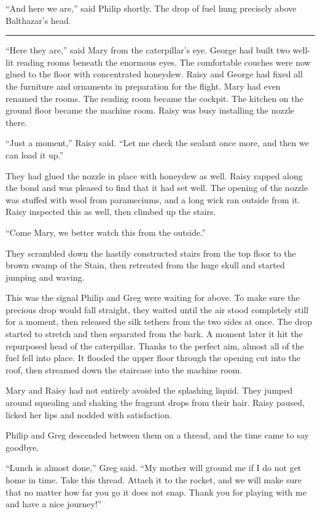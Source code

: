 \documentclass[10pt]{memoir}
\renewcommand{\pfbreakdisplay}{\bigskip \ding{166} \bigskip}
\newcommand{\secbreak}{\fancybreak{\pfbreakdisplay}}
\begin{document}
``And here we are,'' said Philip shortly. The drop of fuel hung precisely above
Balthazar's head.

\secbreak

``Here they are,'' said Mary from the caterpillar's eye. George had built two
well-lit reading rooms beneath the enormous eyes. The comfortable couches were
now glued to the floor with concentrated honeydew. Raisy and George had fixed
all the furniture and ornaments in preparation for the flight. Mary had even
renamed the rooms. The reading room became the cockpit. The kitchen on the
ground floor became the machine room. Raisy was busy installing the nozzle
there.

``Just a moment,'' Raisy said. ``Let me check the sealant once more, and then
we can load it up.''

They had glued the nozzle in place with honeydew as well. Raisy rapped along
the bond and was pleased to find that it had set well. The opening of the
nozzle was stuffed with wool from parameciums, and a long wick ran outside from
it. Raisy inspected this as well, then climbed up the stairs.

``Come Mary, we better watch this from the outside.''

They scrambled down the hastily constructed stairs from the top floor to the
brown swamp of the Stain, then retreated from the huge skull and started
jumping and waving.

This was the signal Philip and Greg were waiting for above. To make sure the
precious drop would fall straight, they waited until the air stood completely
still for a moment, then released the silk tethers from the two sides at once.
The drop started to stretch and then separated from the bark. A moment later it
hit the repurposed head of the caterpillar. Thanks to the perfect aim, almost
all of the fuel fell into place. It flooded the upper floor through the opening
cut into the roof, then streamed down the staircase into the machine room.

Mary and Raisy had not entirely avoided the splashing liquid. They jumped
around squealing and shaking the fragrant drops from their hair. Raisy paused,
licked her lips and nodded with satisfaction.

Philip and Greg descended between them on a thread, and the time came to say
goodbye.

``Lunch is almost done,'' Greg said. ``My mother will ground me if I do not get
home in time. Take this thread. Attach it to the rocket, and we will make sure
that no matter how far you go it does not snap. Thank you for playing with me
and have a nice journey!''
\end{document}
